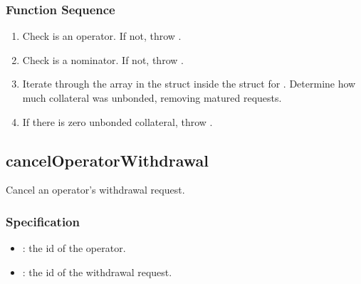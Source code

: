 \documentclass[a4paper,10pt,english]{sphinxmanual}
\begin{document}
\subsubsection{Function Sequence}
\label{\detokenize{spec/nomination:id32}}\begin{enumerate}
%
\item {} 
Check  is an operator. If not, throw .

\item {} 
Check  is a nominator. If not, throw .

\item {} 
Iterate through the  array in the  struct inside the  struct for . Determine how much collateral was unbonded, removing matured requests.

\item {} 
If there is zero unbonded collateral, throw .

\end{enumerate}


\subsection{cancelOperatorWithdrawal}
\label{\detokenize{spec/nomination:canceloperatorwithdrawal}}\label{\detokenize{spec/nomination:id33}}
Cancel an operator’s withdrawal request.


\subsubsection{Specification}
\label{\detokenize{spec/nomination:id34}}


\begin{itemize}
\item {} 
: the id of the operator.

\item {} 
: the id of the withdrawal request.

\end{itemize}
\end{document}
